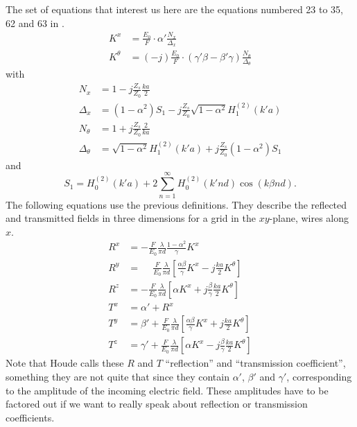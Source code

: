 The set of equations that interest us here are the equations numbered 23 to 35, 62 and 63 in \cite{houde_2001}.
\begin{align}
    K^x &= \frac{E_0}{F} \cdot \alpha' \frac{N_x}{\Delta_x}
    \\
    K^\theta &= (-j) \frac{E_0}{F} \cdot (\gamma' \beta - \beta' \gamma) \frac{N_\theta}{\Delta_\theta}
\end{align}
with
\begin{align}
    N_x
    &=
    1 - j \frac{Z_s}{Z_0} \frac{ka}{2}
    \\
    \Delta_x
    &=
    (1 - \alpha^2) S_1 - j \frac{Z_s}{Z_0} \sqrt{1 - \alpha^2}H_1^{(2)} (k'a)
    \\
    N_\theta
    &=
    1 + j \frac{Z_s}{Z_0} \frac{2}{ka}
    \\
    \Delta_\theta
    &=
    \sqrt{1 - \alpha^2} H_1^{(2)} (k'a) + j \frac{Z_s}{Z_0} (1 - \alpha^2) S_1
\end{align}
and
\begin{equation}
    S_1 = H_0^{(2)} (k'a) + 2
    \sum_{n=1}^\infty
    H_0^{(2)}(k'nd) \cos (k \beta nd)
    \text{.}
    \label{eq:infinite_hankel}
\end{equation}
The following equations use the previous definitions.
They describe the reflected and transmitted fields in three dimensions for a grid in the $xy$-plane, wires along~$x$.
\begin{align}
    R^x
    &=
    -\frac{F}{E_0}
    \frac{\lambda}{\pi d}
    \frac{1 - \alpha^2}{\gamma} K^x
    \label{eq:houde_Rx}
    \\
    R^y
    &=
    \phantom{-}
    \frac{F}{E_0}
    \frac{\lambda}{\pi d}
    \left[
        \frac{\alpha \beta}{\gamma} K^x
        -
        j \frac{ka}{2} K^\theta
    \right]
    \\
    R^z
    &=
    -\frac{F}{E_0}
    \frac{\lambda}{\pi d}
    \left[
       \alpha K^x
       +
       j \frac{\beta}{\gamma} \frac{ka}{2} K^\theta
    \right]
    \\
    T^x &= \alpha' + R^x
    \\
    T^y
    &=
    \beta' +
    \frac{F}{E_0}
    \frac{\lambda}{\pi d}
    \left[
        \frac{\alpha \beta}{\gamma} K^x + j \frac{ka}{2} K^\theta
    \right]
    \\
    T^z
    &=
    \gamma' +
    \frac{F}{E_0}
    \frac{\lambda}{\pi d}
    \left[
        \alpha K^x - j \frac{\beta}{\gamma} \frac{ka}{2} K^\theta
    \right]
\end{align}
Note that Houde calls these $R$ and $T$ ``reflection'' and ``transmission coefficient'', something they are not quite that since they contain $\alpha'$, $\beta'$ and $\gamma'$, corresponding to the amplitude of the incoming electric field.
These amplitudes have to be factored out if we want to really speak about reflection or transmission coefficients.

